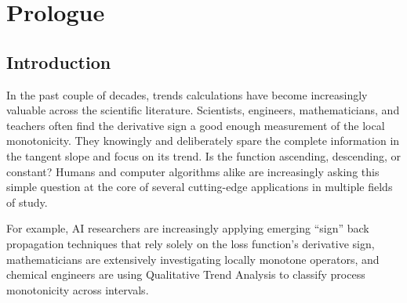 \documentclass[11pt]{book}
\begin{document}



\pagestyle{empty} %

\tableofcontents %

\cleardoublepage %

\pagestyle{fancy} %



\part{Prologue}

\renewcommand\nomgroup[1]{%
  \item[\bfseries
  \ifstrequal{#1}{P}{Physics constants}{%
  \ifstrequal{#1}{N}{Number sets}{%
  \ifstrequal{#1}{M}{Mathematical Operators}{%
  \ifstrequal{#1}{O}{Other symbols}{}}}}%
]}

\chapter{Introduction}

In the past couple of decades, trends calculations have become increasingly
valuable across the scientific literature. Scientists, engineers,
mathematicians, and teachers often find the derivative sign a good
enough measurement of the local monotonicity. They knowingly and deliberately
spare the complete information in the tangent slope and focus on its
trend. Is the function ascending, descending, or constant? Humans
and computer algorithms alike are increasingly asking this simple
question at the core of several cutting-edge applications in multiple
fields of study.

For example, AI researchers are increasingly applying emerging “sign”
back propagation techniques that rely solely on the loss function's
derivative sign, mathematicians are extensively investigating locally
monotone operators, and chemical engineers are using Qualitative
Trend Analysis to classify process monotonicity across intervals.
\end{document}
